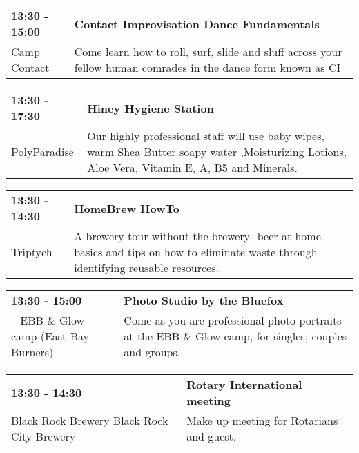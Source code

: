 \begin{tabular}{ p{1in} p{2.2in} }
    \textbf{13:30 - 15:00} & \textbf{Contact Improvisation Dance Fundamentals} \\
    Camp Contact \newline  & Come learn how to roll, surf, slide and sluff across your fellow human comrades in the dance form known as CI \\
    \hline 
\end{tabular}
    
\begin{tabular}{ p{1in} p{2.2in} }
    \textbf{13:30 - 17:30} & \textbf{Hiney Hygiene Station} \\
    PolyParadise \newline  & Our highly professional staff  will use baby wipes, warm Shea Butter soapy water ,Moisturizing Lotions, Aloe Vera, Vitamin E, A, B5 and Minerals. \\
    \hline 
\end{tabular}
    
\begin{tabular}{ p{1in} p{2.2in} }
    \textbf{13:30 - 14:30} & \textbf{HomeBrew HowTo} \\
    Triptych \newline  & A brewery tour without the brewery- beer at home basics and tips on how to eliminate waste through identifying reusable resources. \\
    \hline 
\end{tabular}
    
\begin{tabular}{ p{1in} p{2.2in} }
    \textbf{13:30 - 15:00} & \textbf{Photo Studio by the Bluefox} \\
    ~ \newline EBB \& Glow camp (East Bay Burners) & Come as you are professional photo portraits at the EBB \& Glow camp, for singles, couples and groups. \\
    \hline 
\end{tabular}
    
\begin{tabular}{ p{1in} p{2.2in} }
    \textbf{13:30 - 14:30} & \textbf{Rotary International meeting} \\
    Black Rock Brewery \newline Black Rock City Brewery & Make up meeting for Rotarians and guest. \\
    \hline 
\end{tabular}
    
